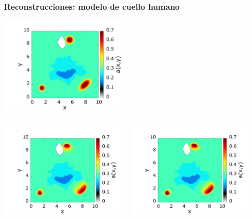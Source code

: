 
\begin{frame}
\frametitle{Reconstrucciones: modelo de cuello humano}

\centering
  \includegraphics[width=0.5\textwidth]{figuras/necktrue.png}

\vspace{-0.04\textheight}
\begin{columns}[t]  
\begin{column}{0.5\textwidth}
  \includegraphics[width=1.0\textwidth]{figuras/necksweep.png}
\end{column} 
\begin{column}{0.5\textwidth}
  \includegraphics[width=1.0\textwidth]{figuras/neckmss.png}
\end{column} 


\end{columns}
\end{frame}
